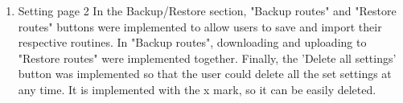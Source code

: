 \begin{enumerate}[label=\arabic*.]
\begin{enumerate}[label*={\arabic*.},ref=\theenumi.\arabic*]
          \begin{enumerate}[label*={\arabic*.},ref=\theenumi.\arabic*]
              \setlength{\itemindent}{0.5cm}
              \item Setting page 2
            In the Backup/Restore section, "Backup routes" and "Restore routes" buttons were implemented to allow users to save and import their respective routines. In "Backup routes", downloading and uploading to "Restore routes" were implemented together. Finally, the 'Delete all settings' button was implemented so that the user could delete all the set settings at any time. It is implemented with the x mark, so it can be easily deleted. \\\\
          \end{enumerate}
\end{enumerate}
\end{enumerate}